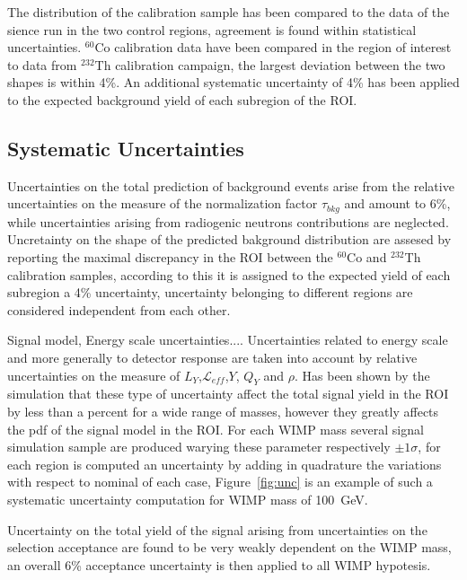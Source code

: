 The distribution of the calibration sample has been compared to the data of the sience run in the two control regions,
agreement is found within statistical uncertainties. $^{60}$Co calibration data have been compared in the region of interest to  
data from $^{232}$Th calibration campaign, the largest deviation between the two shapes is within 4\%. An additional systematic
uncertainty of 4\% has been applied to the expected background yield of each subregion of the ROI.




\subsection{Systematic Uncertainties}

Uncertainties on the total prediction of background events arise from the relative uncertainties on the measure of the normalization 
factor $\tau_{bkg}$ and amount to 6\%, while uncertainties arising from radiogenic neutrons contributions are neglected. 
Uncretainty on the shape of the predicted bakground distribution are assesed by reporting the maximal discrepancy in the ROI between
the $^{60}$Co and $^{232}$Th calibration samples, according to this it is assigned to the expected yield of each subregion a 4\% uncertainty,
uncertainty belonging to different regions are considered independent from each other.

Signal model, Energy scale uncertainties.... Uncertainties related to energy scale and more generally to detector response 
are taken into account by relative uncertainties on the measure of $L_Y$,$\mathcal{L}_{eff}$,$Y$, $Q_Y$ and $\rho$. Has been shown 
by the simulation that these type of uncertainty affect the total signal yield in the ROI by less than a percent for a wide range of masses,
however they greatly affects the pdf of the signal model in the ROI. For each WIMP mass several signal simulation sample are produced 
warying these parameter respectively $\pm 1 \sigma$, for each region is computed an uncertainty by adding in quadrature the variations
with respect to nominal of each case, Figure~\ref{fig:unc} is an example of such a systematic uncertainty computation for WIMP mass of 100~GeV.

Uncertainty on the total yield of the signal arising from uncertainties on the selection acceptance are found to be very weakly dependent on 
the WIMP mass, an overall 6\% acceptance uncertainty is then applied to all WIMP hypotesis.

